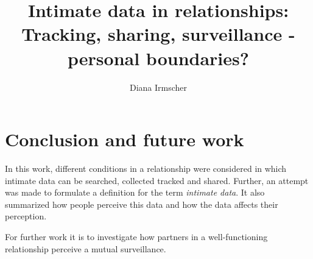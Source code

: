 \documentclass[journal]{vgtc}                %
\title{Intimate data in relationships: Tracking, sharing, surveillance - personal boundaries?}
\author{Diana Irmscher}
\begin{document}

\maketitle

%
%










\section{Conclusion and future work}
In this work, different conditions in a relationship  were considered in which intimate data can be searched, collected tracked and shared.
Further, an attempt was made to formulate a definition for the term \textit{intimate data}. It also summarized how people perceive this data and how the data affects their perception.

For further work it is to investigate how partners in a well-functioning relationship perceive a mutual surveillance.

\label{sec:conculsion}

\printbibliography
\end{document}
